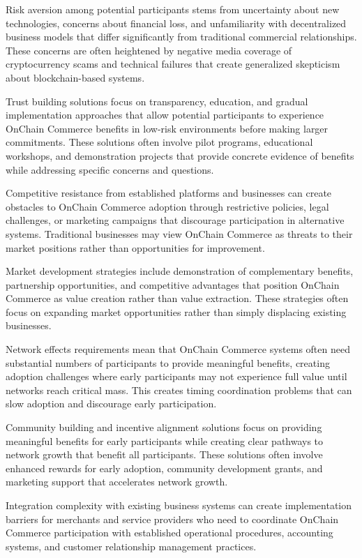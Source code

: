 \documentclass[
  Letterpaper,
]{scrbook}
\begin{document}
Risk aversion among potential participants stems from uncertainty about
new technologies, concerns about financial loss, and unfamiliarity with
decentralized business models that differ significantly from traditional
commercial relationships. These concerns are often heightened by
negative media coverage of cryptocurrency scams and technical failures
that create generalized skepticism about blockchain-based systems.

Trust building solutions focus on transparency, education, and gradual
implementation approaches that allow potential participants to
experience OnChain Commerce benefits in low-risk environments before
making larger commitments. These solutions often involve pilot programs,
educational workshops, and demonstration projects that provide concrete
evidence of benefits while addressing specific concerns and questions.

Competitive resistance from established platforms and businesses can
create obstacles to OnChain Commerce adoption through restrictive
policies, legal challenges, or marketing campaigns that discourage
participation in alternative systems. Traditional businesses may view
OnChain Commerce as threats to their market positions rather than
opportunities for improvement.

Market development strategies include demonstration of complementary
benefits, partnership opportunities, and competitive advantages that
position OnChain Commerce as value creation rather than value
extraction. These strategies often focus on expanding market
opportunities rather than simply displacing existing businesses.

Network effects requirements mean that OnChain Commerce systems often
need substantial numbers of participants to provide meaningful benefits,
creating adoption challenges where early participants may not experience
full value until networks reach critical mass. This creates timing
coordination problems that can slow adoption and discourage early
participation.

Community building and incentive alignment solutions focus on providing
meaningful benefits for early participants while creating clear pathways
to network growth that benefit all participants. These solutions often
involve enhanced rewards for early adoption, community development
grants, and marketing support that accelerates network growth.

Integration complexity with existing business systems can create
implementation barriers for merchants and service providers who need to
coordinate OnChain Commerce participation with established operational
procedures, accounting systems, and customer relationship management
practices.
\end{document}

